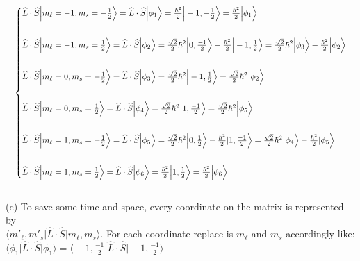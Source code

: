 \documentclass[11pt]{article}
\def\h{\hbar}
\def\l{\ell}
\def\la{\langle}
\def\ra{\rangle}
\renewcommand{\hat}{\widehat}
\theoremstyle{pink}
\theoremstyle{boxedsolution}
\theoremstyle{definition}
\theoremstyle{claim}
\begin{document}
\[
= 
\begin{cases}
\hat{L}\cdot\hat{S}\Big|m_\l=-1,m_s=-\frac{1}{2}\Big\ra= \hat{L}\cdot\hat{S}\Big|\phi_1\Big\ra
=\frac{\h^2}{2}\Big|-1,-\frac{1}{2}\Big\ra=\frac{\h^2}{2}\Big|\phi_1\Big\ra\\
\vspace{2mm}
\\\hat{L}\cdot\hat{S}\Big|m_\l=-1,m_s=\frac{1}{2}\Big\ra = \hat{L}\cdot\hat{S}\Big|\phi_2\Big\ra
= \frac{\sqrt{2}}{2}\h^2\Big|0,\frac{-1}{2}\Big\ra-\frac{\h^2}{2}\Big|-1,\frac{1}{2}\Big\ra =\frac{\sqrt{2}}{2}\h^2\Big|\phi_3\Big\ra-\frac{\h^2}{2}\Big|\phi_2\Big\ra\\
\vspace{2mm}
\\ \hat{L}\cdot\hat{S}\Big|m_\l=0,m_s=-\frac{1}{2}\Big\ra = \hat{L}\cdot\hat{S}\Big|\phi_3\Big\ra=
\frac{\sqrt{2}}{2}\h^2\Big|-1,\frac{1}{2}\Big\ra = \frac{\sqrt{2}}{2}\h^2\Big|\phi_2\Big\ra\\
\vspace{2mm}
\\ \hat{L}\cdot\hat{S}\Big|m_\l=0,m_s=\frac{1}{2}\Big\ra = \hat{L}\cdot\hat{S}\Big|\phi_4\Big\ra=
\frac{\sqrt{2}}{2}\h^2\Big|1,\frac{-1}{2}\Big\ra = \frac{\sqrt{2}}{2}\h^2\Big|\phi_5\Big\ra \\
\vspace{2mm}
\\\hat{L}\cdot\hat{S}\Big|m_\l=1,m_s=-\frac{1}{2}\Big\ra= \hat{L}\cdot\hat{S}\Big|\phi_5\Big\ra=
\frac{\sqrt{2}}{2}\h^2\Big|0,\frac{1}{2}\Big\ra - \frac{\h^2}{2}|1,\frac{-1}{2}\Big\ra=
\frac{\sqrt{2}}{2}\h^2\Big|\phi_4\Big\ra - \frac{\h^2}{2}|\phi_5\Big\ra\\
\vspace{2mm}
\\\hat{L}\cdot\hat{S}\Big|m_\l=1,m_s=\frac{1}{2}\Big\ra = \hat{L}\cdot\hat{S}\Big|\phi_6\Big\ra=
\frac{\h^2}{2}\Big|1,\frac{1}{2}\Big\ra=\frac{\h^2}{2}\Big|\phi_6\Big\ra\\
\end{cases}
\]
\vspace{5mm}
\\(c) To save some time and space, every coordinate on the matrix is represented by\\ $\Big\la m'_\l,m'_s\Big|\hat{L}\cdot\hat{S}\Big|m_\l,m_s\Big\ra$. For each coordinate replace is $m_\l$ and $m_s$ accordingly like:\\ $\Big\la \phi_1\Big|\hat{L}\cdot\hat{S}\Big|\phi_1\Big\ra = \Big\la -1,\frac{-1}{2}\Big|\hat{L}\cdot\hat{S}\Big|-1,\frac{-1}{2}\Big\ra$
\end{document}
